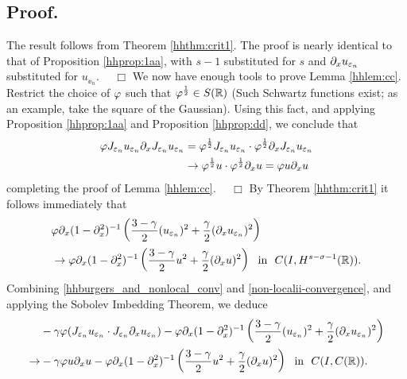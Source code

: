 			\subsection{ Proof.} The result follows from Theorem \ref{hhthm:crit1}.
			The proof is nearly identical to that of
			Proposition \ref{hhprop:1aa}, with $s-1$ substituted for $s$
			and $\partial_x u_{\varepsilon_n}$ substituted for $u_{\ee_n}$. $\quad \Box$
			We now have enough tools to prove Lemma \ref{hhlem:cc}. Restrict the
			choice of $\varphi$ such that $\varphi^\frac{1}{2} \in S(\mathbb{R})$
			(Such Schwartz functions exist; as an example, take the square
			of the Gaussian). Using this fact, and applying Proposition
			\ref{hhprop:1aa} and Proposition \ref{hhprop:dd}, we conclude that
			\begin{equation*}
				\begin{split}
					\varphi J_{\varepsilon_n} u_{\varepsilon_n} \partial_x J_{\varepsilon_n} u_{\varepsilon_n} 
					& = \varphi^\frac{1}{2} J_{\varepsilon_n} u_{\varepsilon_n} \cdot
					\varphi^\frac{1}{2} \partial_x J_{\varepsilon_n} u_{\varepsilon_n}
					\\
					& \to \varphi^\frac{1}{2} u \cdot \varphi^\frac{1}{2} \partial_x u = \varphi
					u \partial_x u
				\end{split}
			\end{equation*}
			completing the proof of Lemma \ref{hhlem:cc}. $\quad \Box$
%
%
%
%
By Theorem \ref{hhthm:crit1} it follows immediately that
		\begin{equation}
			\begin{split}
				& \varphi \partial_x(1- \partial_x^2)^{-1} \left( \frac{3-\gamma}{2}
				(u_{\varepsilon_n})^2
				 + \frac{\gamma}{2} (\partial_x u_{\varepsilon_n})^2 \right )
				 \\
				 & \to
				 \varphi \partial_x(1- \partial_x^2)^{-1} \left( \frac{3-\gamma}{2} u^2
				 + \frac{\gamma}{2} (\partial_x u)^2 \right ) \ \
				 \text{in} \ \ C(I, H^{s-\sigma-1}(\mathbb{R})).
				\label{non-localii-convergence}
			\end{split}
		\end{equation}
		Combining \eqref{hhburgers_and_nonlocal_conv} and
		\eqref{non-localii-convergence}, and applying the Sobolev Imbedding
		Theorem, we deduce 
		\begin{equation}
			\begin{split}
				& -\gamma \varphi (J_{\varepsilon_n} u_{\varepsilon_n} \cdot J_{\varepsilon_n} \partial_x
				u_{\varepsilon_n}) -
				\varphi \partial_x(1- \partial_x^2)^{-1} \left( \frac{3-\gamma}{2}
				(u_{\varepsilon_n})^2
				 + \frac{\gamma}{2} (\partial_x u_{\varepsilon_n})^2 \right )
				 \\
				 \to & -\gamma \varphi u \partial_x u -
				 \varphi \partial_x(1- \partial_x^2)^{-1} \left( \frac{3-\gamma}{2} u^2
				 + \frac{\gamma}{2} (\partial_x u)^2 \right ) \ \
				 \text{in} \ \ C(I, C(\mathbb{R})).
				\label{llloc-non-loc-tog}
			\end{split}
		\end{equation}
